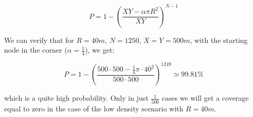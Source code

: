 \begin{equation}\label{eq:nocatastropheprobability}
	P = 1 - {\left(\frac{XY - \alpha\pi R^2}{XY}\right)}^{N-1}
\end{equation}

We can verify that for \(R\!=\!40m\), \(N\!=\!1250\), \(X\!=\!Y\!=\!500m\), with
the starting node in the corner (\(\alpha\!=\!\frac{1}{4}\)), we get:

\[
	P = 1 - {\left(\frac{500\cdot500 -
	\frac{1}{4}\pi\cdot40^2}{500\cdot500}\right)}^{1249} \simeq 99.81\%
\]

which is a quite high probability. Only in just \(\frac{1}{500}\) cases we will
get a coverage equal to zero in the case of the low density scenario with
\(R\!=\!40m\).

